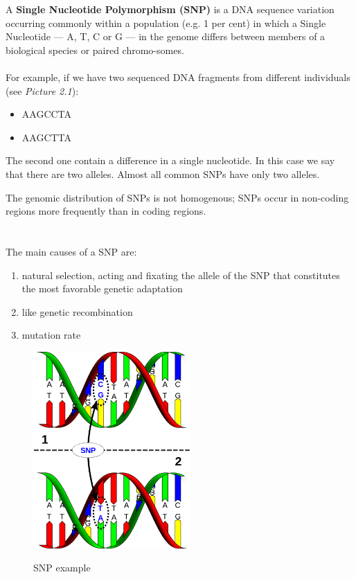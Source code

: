 A \textbf{Single Nucleotide Polymorphism (SNP)} is a DNA sequence variation occurring commonly within a population (e.g. 1 per cent) in which a Single Nucleotide — A, T, C or G — in the genome differs between members of a biological species or paired chromo-somes. 
\\
\\For example, if we have two sequenced DNA fragments from different individuals (see \emph{Picture 2.1}):

\begin{itemize}
	\item AAGCCTA
	\item AAGCTTA
\end{itemize}

The second one contain a difference in a single nucleotide. In this case we say that there are two alleles. Almost all common SNPs have only two alleles. 

The genomic distribution of SNPs is not homogenous; SNPs occur in non-coding regions more frequently than in coding regions.
\\
\\
\\The main causes of a SNP are:

\begin{enumerate}
	\item natural selection, acting and fixating the allele of the SNP that constitutes the most favorable genetic adaptation
	\item like genetic recombination
	\item mutation rate
	\end{enumerate}

\begin{figure}[ht!]
	\centering
	\includegraphics[width=60mm]{../Images/SNP_example.png}
	\label{overflow}
	\caption{SNP example}
	\end{figure}


